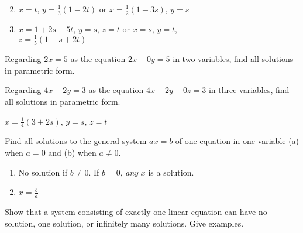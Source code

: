 \begin{multicols}{2}
\begin{ex}
\begin{sol}
\begin{enumerate}[label={\alph*.}]
\setcounter{enumi}{1}
\item  $x = t$, $y = \frac{1}{3}(1 - 2t)$ or $x = \frac{1}{2}(1 - 3s)$, $y = s$

\setcounter{enumi}{3}
\item  $x = 1 + 2s - 5t$, $y = s$, $z = t$ or $x = s$, $y = t$, \\ $z = \frac{1}{5}(1 - s + 2t)$

\end{enumerate}
\end{sol}
\end{ex}

\begin{ex}
Regarding $2x = 5$ as the equation \newline $2x + 0y = 5$ in two variables, find all solutions in parametric form.
\end{ex}

\begin{ex}
Regarding $4x - 2y = 3$ as the equation $4x - 2y + 0z = 3$ in three variables, find all solutions in parametric form.

\begin{sol}
$x = \frac{1}{4}(3 + 2s)$, $y = s$, $z = t$
\end{sol}
\end{ex}

\begin{ex}
Find all solutions to the general system $ax = b$ of one equation in one variable (a) when $a = 0$ and (b) when $a \neq 0$.

\begin{sol}
\begin{enumerate}[label={\alph*.}]
\item  No solution if $b \neq 0$. If $b = 0$, \textit{any} $x$ is a solution.

\item  $ x = \frac{b}{a} $

\end{enumerate}
\end{sol}
\end{ex}

\begin{ex}
Show that a system consisting of exactly one linear equation can have no solution, one solution, or infinitely many solutions. Give examples.
\end{ex}


\end{multicols}
